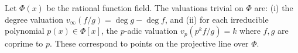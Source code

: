 Let $\Phi(x)$ be the rational function field. The valuations trivial on $\Phi$ are: (i) the degree valuation $v_\infty(f/g) = \deg g - \deg f$, and (ii) for each irreducible polynomial $p(x) \in \Phi[x]$, the $p$-adic valuation $v_p(p^k f/g) = k$ where $f, g$ are coprime to $p$. These correspond to points on the projective line over $\Phi$.
